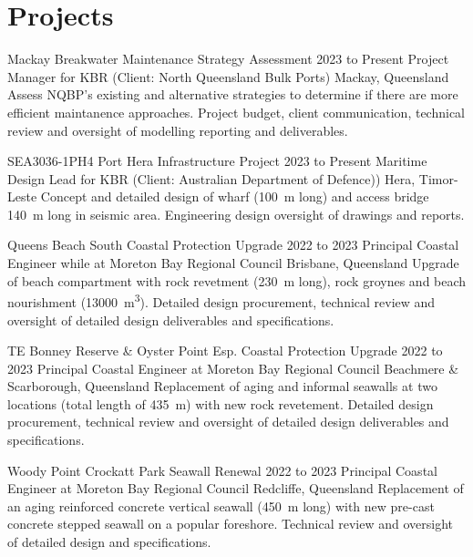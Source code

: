 \section{Projects}


	\entrytableproject%
	{Mackay Breakwater Maintenance Strategy Assessment}
	{2023 to Present}
	{}
	{Project Manager for KBR (Client: North Queensland Bulk Ports)}
	{Mackay, Queensland}
	{Assess NQBP's existing and alternative strategies to determine if there are more efficient maintanence approaches.}
	{Project budget, client communication, technical review and oversight of modelling reporting and deliverables.}

	\entrytableproject%
	{SEA3036-1PH4 Port Hera Infrastructure Project}
	{2023 to Present}
	{}
	{Maritime Design Lead for KBR (Client: Australian Department of Defence))}
	{Hera, Timor-Leste}
	{Concept and detailed design of wharf (\SI{100}{\m} long) and access bridge {\SI{140}{\m} long in seismic area.}}
	{Engineering design oversight of drawings and reports.}

	\entrytableproject%
	{Queens Beach South Coastal Protection Upgrade}
	{2022 to 2023}
	{}
	{Principal Coastal Engineer while at Moreton Bay Regional Council}
	{Brisbane, Queensland}
	{Upgrade of beach compartment with rock revetment (\SI{230}{\m} long), rock groynes and beach nourishment (\SI{13000}{\m\cubed}).}
	{Detailed design procurement, technical review and oversight of detailed design deliverables and specifications.}
	
	\entrytableproject%
	{TE Bonney Reserve \& Oyster Point Esp. Coastal Protection Upgrade}
	{2022 to 2023}
	{}
	{Principal Coastal Engineer at Moreton Bay Regional Council}
	{Beachmere \& Scarborough, Queensland}
	{Replacement of aging and informal seawalls at two locations (total length of \SI{435}{\m}) with new rock revetement.}
	{Detailed design procurement, technical review and oversight of detailed design deliverables and specifications.}

	\entrytableproject%
	{Woody Point Crockatt Park Seawall Renewal}
	{2022 to 2023}
	{}
	{Principal Coastal Engineer at Moreton Bay Regional Council}
	{Redcliffe, Queensland}
	{Replacement of an aging reinforced concrete vertical seawall (\SI{450}{\m} long) with new pre-cast concrete stepped seawall on a popular foreshore.}
	{Technical review and oversight of detailed design and specifications.}

